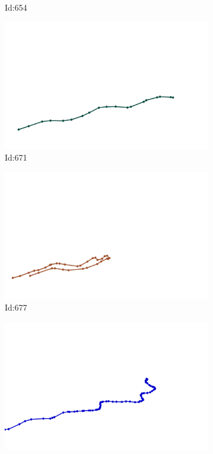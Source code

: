\documentclass[12pt,twoside]{report}
\begin{document}
\begin{figure}
\begin{subfigure}[b]{0.20\textwidth}
\caption{Id:654}
\end{subfigure}
\begin{subfigure}[b]{0.20\textwidth}
\centering
\includegraphics[width=\textwidth]{../trajectories/671.png}
\caption{Id:671}
\end{subfigure}
\begin{subfigure}[b]{0.20\textwidth}
\centering
\includegraphics[width=\textwidth]{../trajectories/677.png}
\caption{Id:677}
\end{subfigure}
\begin{subfigure}[b]{0.20\textwidth}
\centering
\includegraphics[width=\textwidth]{../trajectories/700.png}

\end{subfigure}
\end{figure}
\end{document}
